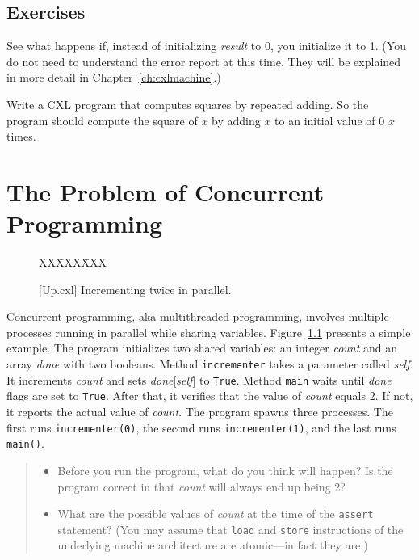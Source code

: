 \documentclass{report}
\newcommand{\cxlsource}[1]{
\begin{tabbing}
XX\=XXX\=XXX\kill
    
\end{tabbing}
}
\newenvironment{code}{
\tcolorbox
}{
\endtcolorbox
}
\begin{document}
\section*{Exercises}
\begin{problems}
\item See what happens if, instead of initializing \textit{result} to 0,
you initialize it to 1.  (You do not need to understand the error report at this time.  They will be explained in more detail in Chapter~\ref{ch:cxlmachine}.)
\item Write a CXL program that computes squares by repeated adding.  So the program
should compute the square of $x$ by adding $x$ to an initial value of 0 $x$ times.
\end{problems}

\chapter{The Problem of Concurrent Programming}
\label{ch:concurrent}

\begin{figure}
\begin{code}
\cxlsource{Up}
\end{code}
\caption{[Up.cxl] Incrementing twice in parallel.}
\label{fig:inc}
\end{figure}


Concurrent programming, aka multithreaded programming, involves multiple
processes
running in parallel while sharing variables.
Figure~\ref{fig:inc} presents a simple example.
The program
initializes two shared variables: an integer \textit{count} and
an array \textit{done} with two booleans.
Method \texttt{incrementer} takes a parameter called \textit{self}.
It increments \textit{count} and sets \textit{done}[\textit{self}] to \texttt{True}.
Method \texttt{main} waits until \textit{done} flags are set to \texttt{True}.
After that, it verifies that the value of \textit{count} equals 2.  If not,
it reports the actual value of \textit{count}.
The program spawns three processes.
The first runs \texttt{incrementer(0)}, the second runs
\texttt{incrementer(1)}, and the last runs \texttt{main()}.

\begin{quote}
\begin{itemize}
\item Before you run the program, what do you think will happen?  Is the
program correct in that \textit{count} will always end up being 2?
\item What are the possible values of \textit{count} at the time of the
\texttt{assert} statement?
(You may assume that \texttt{load} and \texttt{store} instructions of the
underlying machine architecture are atomic---in fact they are.)
\end{itemize}
\end{quote}
\end{document}

